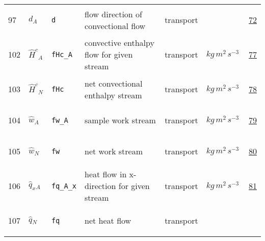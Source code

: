 \begin{longtable}{|p{1cm}|p{2.5cm}|p{4.5cm}|p{8cm}|p{3.0cm}|p{3cm}|p{1cm}|}
    97
             & \hypertarget{"v:97"}{ $ {d}{_{A}} $}
             & \verb|d|
             & flow direction of convectional flow
             & \begin{lay}transport \end{lay}
             & $  $
             & \hyperlink{"e:72"}{ 72 }
                 \\
    102
             & \hypertarget{"v:102"}{ $ {{\hat{H}^c}}{_{A}} $}
             & \verb|fHc_A|
             & convective enthalpy flow for given stream
             & \begin{lay}transport \end{lay}
             & $ kg \,m^{2} \,s^{-3} \, $
             & \hyperlink{"e:77"}{ 77 }
                 \\
    103
             & \hypertarget{"v:103"}{ $ {{\hat{H}^c}}{_{N}} $}
             & \verb|fHc|
             & net convectional enthalpy stream
             & \begin{lay}transport \end{lay}
             & $ kg \,m^{2} \,s^{-3} \, $
             & \hyperlink{"e:78"}{ 78 }
                 \\
    104
             & \hypertarget{"v:104"}{ $ {{\hat{w}}}{_{A}} $}
             & \verb|fw_A|
             & sample work stream
             & \begin{lay}transport \end{lay}
             & $ kg \,m^{2} \,s^{-3} \, $
             & \hyperlink{"e:79"}{ 79 }
                 \\
    105
             & \hypertarget{"v:105"}{ $ {{\hat{w}}}{_{N}} $}
             & \verb|fw|
             & net work stream
             & \begin{lay}transport \end{lay}
             & $ kg \,m^{2} \,s^{-3} \, $
             & \hyperlink{"e:80"}{ 80 }
                 \\
    106
             & \hypertarget{"v:106"}{ $ {{\hat{q}_{x}}}{_{A}} $}
             & \verb|fq_A_x|
             & heat flow in x-direction for given stream
             & \begin{lay}transport \end{lay}
             & $ kg \,m^{2} \,s^{-3} \, $
             & \hyperlink{"e:81"}{ 81 }
                 \\
    107
             & \hypertarget{"v:107"}{ $ {{\hat{q}}}{_{N}} $}
             & \verb|fq|
             & net heat flow
             & \begin{lay}transport \end{lay}

\end{longtable}
